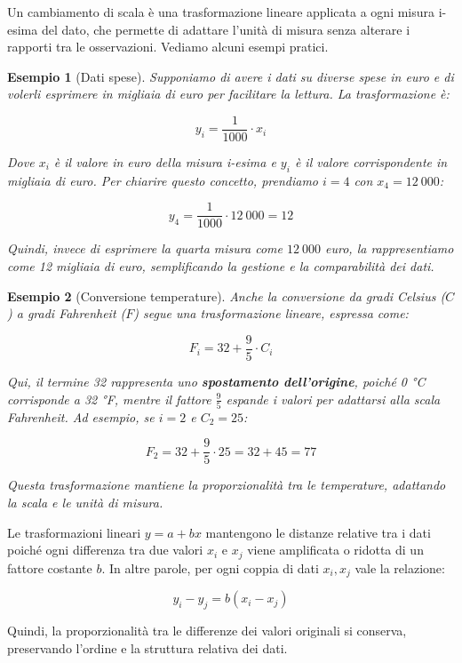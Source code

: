 \documentclass[
  11pt,
]{book}
\theoremstyle{mytheoremstyle}
\theoremstyle{mydefstyle}
\newtheorem{example}{{Esempio}}[section]
\begin{document}
Un cambiamento di scala è una trasformazione lineare applicata a ogni misura i-esima del dato, che permette di adattare l'unità di misura senza alterare i rapporti tra le osservazioni. Vediamo alcuni esempi pratici.

\begin{example}[Dati spese]
Supponiamo di avere i dati su diverse spese in euro e di volerli esprimere in migliaia di euro per facilitare la lettura. La trasformazione è:

\[
y_i = \frac{1}{1000} \cdot x_i
\]

Dove \(x_i\) è il valore in euro della misura i-esima e \(y_i\) è il valore corrispondente in migliaia di euro. Per chiarire questo concetto, prendiamo \(i=4\) con \(x_4 = 12~000\):

\[
y_4 = \frac{1}{1000} \cdot 12~000 = 12
\]

Quindi, invece di esprimere la quarta misura come \(12~000\) euro, la rappresentiamo come 12 \emph{migliaia} di euro, semplificando la gestione e la comparabilità dei dati.
\end{example}

\begin{example}[Conversione temperature]
Anche la conversione da gradi Celsius (\(C\)) a gradi Fahrenheit (\(F\)) segue una trasformazione lineare, espressa come:

\[
F_i = 32 + \frac{9}{5} \cdot C_i
\]

Qui, il termine 32 rappresenta uno \textbf{spostamento dell'origine}, poiché 0 °C corrisponde a 32 °F, mentre il fattore \(\frac{9}{5}\) espande i valori per adattarsi alla scala Fahrenheit. Ad esempio, se \(i=2\) e \(C_2 = 25\):

\[
F_2 = 32 + \frac{9}{5} \cdot 25 = 32 + 45 = 77
\]

Questa trasformazione mantiene la proporzionalità tra le temperature, adattando la scala e le unità di misura.
\end{example}

Le trasformazioni lineari \(y = a + bx\) mantengono le distanze relative tra i dati poiché ogni differenza tra due valori \(x_i\) e \(x_j\) viene amplificata o ridotta di un fattore costante \(b\). In altre parole, per ogni coppia di dati \(x_i, x_j\) vale la relazione:

\[
y_i - y_j = b (x_i - x_j)
\]

Quindi, la proporzionalità tra le differenze dei valori originali si conserva, preservando l'ordine e la struttura relativa dei dati.
\end{document}
